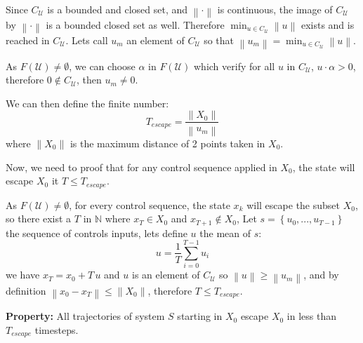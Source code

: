 \documentclass[12pt]{article}
\begin{document}
Since $C_\mathcal{U}$ is a bounded and closed set, and $\left \| \cdot \right \|$ is continuous, the image of $C_\mathcal{U}$ by $\left \| \cdot \right \|$ is a bounded closed set as well.
Therefore  $\min_{  u \in C_\mathcal{U}} \left \| u \right \|$ exists and is reached in $C_\mathcal{U}$. Lets call $u_m$ an element of $C_\mathcal{U}$ so that $\left \| u_m \right \| = \min_{  u \in C_\mathcal{U}} \left \| u \right \|$.

As $F(\mathcal{U}) \neq \emptyset$, we can choose $\alpha$ in $F(\mathcal{U})$ which verify for all $u$ in $C_\mathcal{U}$, $u \cdot \alpha >0$, therefore $0 \notin C_\mathcal{U}$, then $u_m \neq 0$.

We can then define the finite number:
\begin{equation}
T_{escape} = \frac{\left \| X_0 \right \|}{\left \| u_m \right \|}
\end{equation}
where $\left \| X_0 \right \|$ is the maximum distance of 2 points taken in $X_0$.

Now, we need to proof that for any control sequence applied in $X_0$, the state will escape $X_0$ it $T \leq T_{escape}$.

As $F(\mathcal{U}) \neq \emptyset$, for every control sequence, the state $x_k$ will escape the subset $X_0$, so there exist a $T$ in $\mathbb{N}$ where $x_{T} \in X_0$ and $x_{T+1} \notin X_0$, Let $s = \left \{u_0,...,u_{T-1} \right \}$ the sequence of controls inputs, lets define $u$ the mean of $s$:
\begin{equation}
u = \frac{1}{T} \sum_{i=0}^{T-1} u_i
\end{equation}
we have $x_T = x_0 + T \, u$ and $u$ is an element of $C_\mathcal{U}$ so $\left \| u \right \| \geq \left \| u_m \right \|$, and by definition $\left \| x_0 - x_T \right \| \leq \left \| X_0 \right \|$, therefore $T \leq T_ {escape}$.


\textbf{Property:}
All trajectories of system $S$ starting in $X_0$ escape $X_0$ in less than $T_{escape}$ timesteps.
\end{document}
